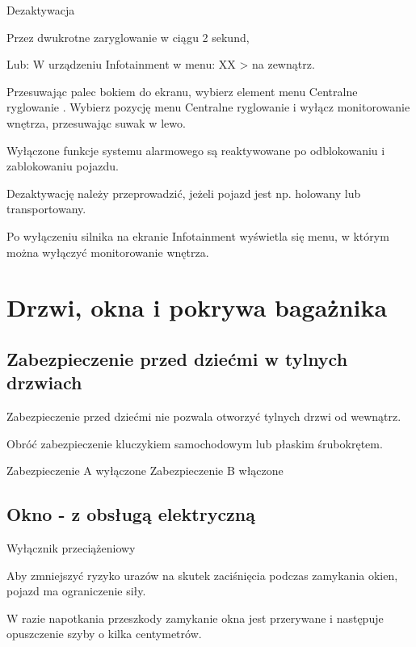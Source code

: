 Dezaktywacja

\begin{itemizeTriangle}
	\itemTriangle Przez dwukrotne zaryglowanie w ciągu 2 sekund,
\end{itemizeTriangle}
Lub:
W urządzeniu Infotainment w menu: XX > na zewnątrz.
\begin{itemizeArrow}
	\itemArrow Przesuwając palec bokiem do ekranu, wybierz element menu Centralne ryglowanie .
	\itemArrow Wybierz pozycję menu Centralne ryglowanie i wyłącz monitorowanie wnętrza, przesuwając suwak w lewo.
\end{itemizeArrow}
Wyłączone funkcje systemu alarmowego są reaktywowane po odblokowaniu i zablokowaniu pojazdu.

Dezaktywację należy przeprowadzić, jeżeli pojazd jest np. holowany lub transportowany.

Po wyłączeniu silnika na ekranie Infotainment wyświetla się menu, w którym można wyłączyć monitorowanie wnętrza.


\section{Drzwi, okna i pokrywa bagażnika}

\subsection{Zabezpieczenie przed dziećmi w tylnych drzwiach}

Zabezpieczenie przed dziećmi nie pozwala otworzyć tylnych drzwi od wewnątrz.


\begin{itemizeArrow}
	\itemArrow Obróć zabezpieczenie kluczykiem samochodowym lub płaskim śrubokrętem.
\end{itemizeArrow}
Zabezpieczenie A wyłączone
Zabezpieczenie B włączone

\subsection{Okno - z obsługą elektryczną}

Wyłącznik przeciążeniowy

Aby zmniejszyć ryzyko urazów na skutek zaciśnięcia podczas zamykania okien, pojazd ma ograniczenie siły.

W razie napotkania przeszkody zamykanie okna jest przerywane i następuje opuszczenie szyby o kilka centymetrów.

